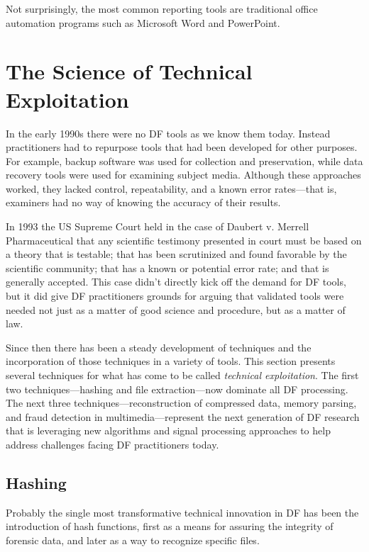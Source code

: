  Not surprisingly, the most common reporting tools are traditional
  office automation programs such as Microsoft Word and PowerPoint. 

\section{The Science of Technical Exploitation}

In the early 1990s there were no DF tools as we know them
today. Instead practitioners had to repurpose tools that had been
developed for other purposes. For example, backup software was
used for collection and preservation, while data recovery tools were used
for examining subject media. Although these approaches worked, they lacked control,
repeatability, and a known error rates---that is, examiners had no way
of knowing the accuracy of their results. 

In 1993 the US Supreme Court held in the case of Daubert v. Merrell
Pharmaceutical 
that any scientific testimony presented in court must be based on a theory
that is testable; that has been scrutinized and found favorable by the
scientific community; that has a known or potential error rate; and
that is generally accepted\cite{daubert}. This case didn't directly
kick off the demand for DF tools, but it did give DF practitioners
grounds for arguing that validated tools were needed not just as a matter
of good science and procedure, but as a matter of law. 

Since then there has been a steady development of techniques and the
incorporation of those techniques in a variety of tools. This section
presents several techniques for what has come to be called
\emph{technical exploitation}. The first two techniques---hashing and
file extraction---now dominate all DF processing. The next three
techniques---reconstruction of compressed data, memory parsing, and
fraud detection in multimedia---represent the next generation of DF
research that is leveraging new algorithms and signal processing
approaches to help address challenges facing DF practitioners today.

\subsection{Hashing}

Probably the single most transformative technical innovation in
DF has been the introduction of hash functions, first as a means for assuring the integrity of forensic data,
and later as a way to recognize specific files.

